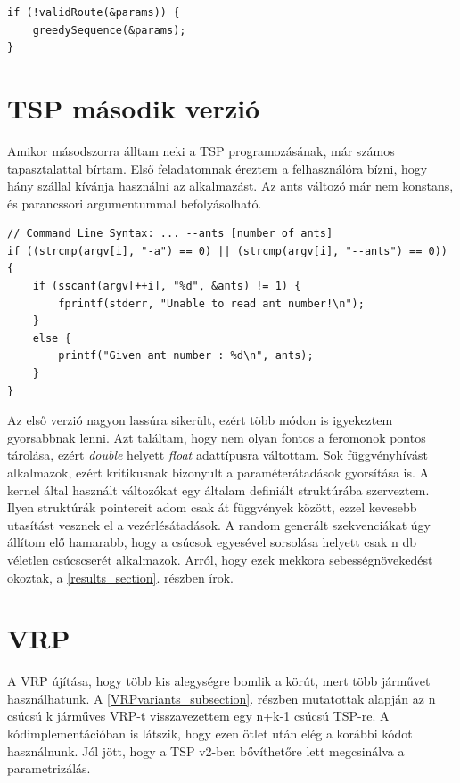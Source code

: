 \begin{lstlisting}[style=CStyle]
if (!validRoute(&params)) {
	greedySequence(&params);
}
\end{lstlisting}

\section{TSP második verzió}
Amikor másodszorra álltam neki a TSP programozásának, már számos tapasztalattal bírtam. Első feladatomnak éreztem a felhasználóra bízni, hogy hány szállal kívánja használni az alkalmazást. Az ants változó már nem konstans, és parancssori argumentummal befolyásolható.

\begin{lstlisting}[style=CStyle]
// Command Line Syntax: ... --ants [number of ants]
if ((strcmp(argv[i], "-a") == 0) || (strcmp(argv[i], "--ants") == 0))
{
	if (sscanf(argv[++i], "%d", &ants) != 1) {
		fprintf(stderr, "Unable to read ant number!\n");
	}
	else {
		printf("Given ant number : %d\n", ants);
	}
}
\end{lstlisting}


 Az első verzió nagyon lassúra sikerült, ezért több módon is igyekeztem gyorsabbnak lenni. Azt találtam, hogy nem olyan fontos a feromonok pontos tárolása, ezért \textit{double} helyett \textit{float} adattípusra váltottam. 
 Sok függvényhívást alkalmazok, ezért kritikusnak bizonyult a paraméterátadások gyorsítása is. A kernel által használt változókat egy általam definiált struktúrába szerveztem. Ilyen struktúrák pointereit adom csak át függvények között, ezzel kevesebb utasítást vesznek el a vezérlésátadások. A random generált szekvenciákat úgy állítom elő hamarabb, hogy a csúcsok egyesével sorsolása helyett csak n db véletlen csúcscserét alkalmazok. Arról, hogy ezek mekkora sebességnövekedést okoztak, a \ref{results_section}. részben írok.

\section{VRP}

A VRP újítása, hogy több kis alegységre bomlik a körút, mert több járművet használhatunk. A \ref{VRPvariants_subsection}. részben mutatottak alapján az n csúcsú k járműves VRP-t visszavezettem egy n+k-1 csúcsú TSP-re. A kódimplementációban is látszik, hogy ezen ötlet után elég a korábbi kódot használnunk. Jól jött, hogy a TSP v2-ben bővíthetőre lett megcsinálva a parametrizálás.

